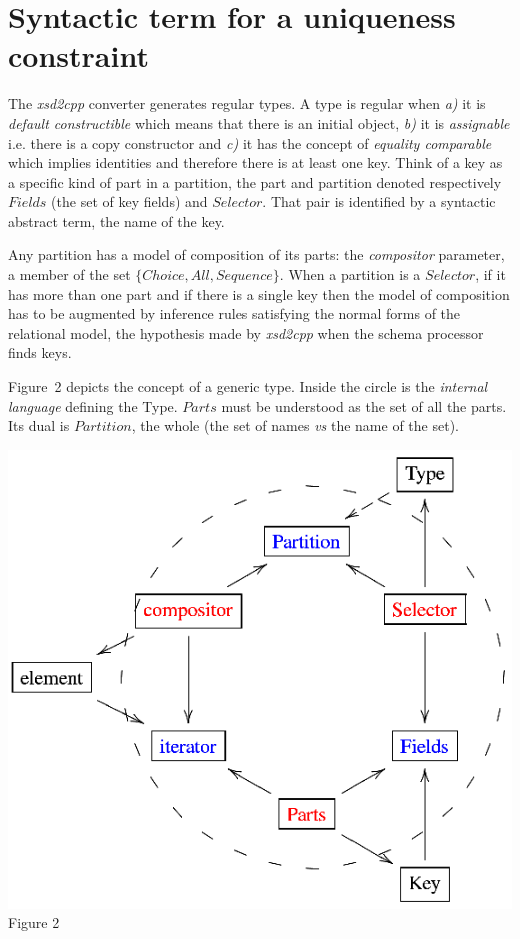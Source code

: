 \section{Syntactic term for a uniqueness constraint} 
The {\it xsd2cpp} converter generates regular types. A type is regular when
{\it a)} it is  {\it default constructible} which means that there is an initial object,
{\it b)} it is {\it assignable} i.e. there is a copy constructor and 
{\it c)} it has the concept of  {\it equality comparable} which implies identities and therefore
there is at least one key. Think of a  key as a specific kind of part in a partition, the 
part and partition denoted respectively $Fields$ (the set of key fields) and $Selector$. That pair is 
identified by a syntactic abstract term, the name of the key.
\noindent
\begin{minipage}[h]{5.2cm}
\indent
Any partition has a model of composition of its parts: the {\it compositor} 
parameter, a member of the set $\{Choice, All, Sequence\}$. When a partition is
a $Selector$, if it has more than one part and if there is a single key then
the model of composition has to be augmented by inference rules satisfying the normal 
forms of the relational model, the hypothesis made by  {\it xsd2cpp} when the 
schema processor finds keys.

Figure~2 depicts the concept of a generic type.
Inside the circle is the {\it internal language} defining the Type.
$Parts$ must be understood as the set of all the parts. Its dual is 
$Partition$, the whole (the set of names {\it vs} the name of the set). 

\end{minipage}
\begin{minipage}[h]{8.8cm}
 \begin{center}

  \includegraphics[]{part8/Viallefond_P52/P52_2.eps}
  \\Figure 2

 \end{center}
\end{minipage}
